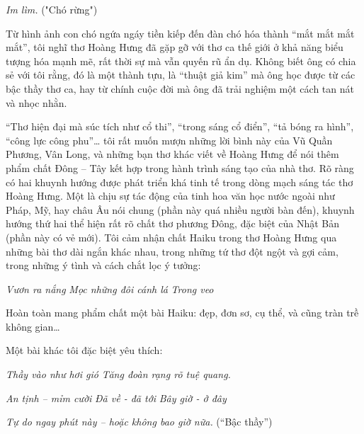 \documentclass[../main.tex]{subfiles}
\begin{document}
\begin{multicols}{2}
\begin{blockquote}
\textit{Im lìm. } 
 	("Chó rừng") 

\end{blockquote}
 
Từ hình ảnh con chó ngứa ngáy tiền kiếp đến đàn chó hóa thành “mắt mắt mắt mắt”, tôi nghĩ thơ Hoàng Hưng đã gặp gỡ với thơ ca thế giới ở khả năng biểu tượng hóa mạnh mẽ, rất thời sự mà vẫn quyến rũ ẩn dụ. Không biết ông có chia sẻ với tôi rằng, đó là một thành tựu, là “thuật giả kim” mà ông học được từ các bậc thầy thơ ca, hay từ chính cuộc đời mà ông đã trải nghiệm một cách tan nát và nhọc nhằn. 
 
“Thơ hiện đại mà súc tích như cổ thi”, “trong sáng cổ điển”, “tả bóng ra hình”, “công lực công phu”… tôi rất muốn mượn những lời bình này của Vũ Quần Phương, Vân Long, và những bạn thơ khác viết về Hoàng Hưng để nói thêm phẩm chất Đông – Tây kết hợp trong hành trình sáng tạo của nhà thơ. Rõ ràng có hai khuynh hướng được phát triển khá tinh tế trong dòng mạch sáng tác thơ Hoàng Hưng. Một là chịu sự tác động của tinh hoa văn học nước ngoài như Pháp, Mỹ, hay châu Âu nói chung (phần này quá nhiều người bàn đến), khuynh hướng thứ hai thể hiện rất rõ chất thơ phương Đông, đặc biệt của Nhật Bản (phần này có vẻ mới). Tôi cảm nhận chất Haiku trong thơ Hoàng Hưng qua những bài thơ dài ngắn khác nhau, trong những tứ thơ đột ngột và gợi cảm, trong những ý tình và cách chắt lọc ý tưởng:         
\begin{blockquote}
        
\textit{Vươn ra nắng}        
\textit{Mọc những đôi cánh lá}        
\textit{Trong veo} 

\end{blockquote}
 
Hoàn toàn mang phẩm chất một bài Haiku: đẹp, đơn sơ, cụ thể, và cũng tràn trề không gian… 
 
Một bài khác tôi đặc biệt yêu thích:         
\begin{blockquote}
        
\textit{Thầy vào như hơi gió} 
\textit{Tăng đoàn rạng rõ tuệ quang.} 
        
\textit{An tịnh – mỉm cười}        
\textit{Đã về - đã tới} 
\textit{Bây giờ - ở đây} 
        
\textit{Tự do ngay phút này – hoặc không bao giờ nữa. }        
(“Bậc thầy”) 

\end{blockquote}
 

\end{multicols}
\end{document}
